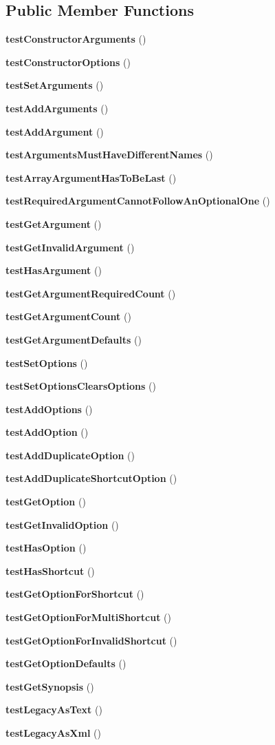 \subsection*{Public Member Functions}
\begin{DoxyCompactItemize}
\item 
{\bf test\+Constructor\+Arguments} ()
\item 
{\bf test\+Constructor\+Options} ()
\item 
{\bf test\+Set\+Arguments} ()
\item 
{\bf test\+Add\+Arguments} ()
\item 
{\bf test\+Add\+Argument} ()
\item 
{\bf test\+Arguments\+Must\+Have\+Different\+Names} ()
\item 
{\bf test\+Array\+Argument\+Has\+To\+Be\+Last} ()
\item 
{\bf test\+Required\+Argument\+Cannot\+Follow\+An\+Optional\+One} ()
\item 
{\bf test\+Get\+Argument} ()
\item 
{\bf test\+Get\+Invalid\+Argument} ()
\item 
{\bf test\+Has\+Argument} ()
\item 
{\bf test\+Get\+Argument\+Required\+Count} ()
\item 
{\bf test\+Get\+Argument\+Count} ()
\item 
{\bf test\+Get\+Argument\+Defaults} ()
\item 
{\bf test\+Set\+Options} ()
\item 
{\bf test\+Set\+Options\+Clears\+Options} ()
\item 
{\bf test\+Add\+Options} ()
\item 
{\bf test\+Add\+Option} ()
\item 
{\bf test\+Add\+Duplicate\+Option} ()
\item 
{\bf test\+Add\+Duplicate\+Shortcut\+Option} ()
\item 
{\bf test\+Get\+Option} ()
\item 
{\bf test\+Get\+Invalid\+Option} ()
\item 
{\bf test\+Has\+Option} ()
\item 
{\bf test\+Has\+Shortcut} ()
\item 
{\bf test\+Get\+Option\+For\+Shortcut} ()
\item 
{\bf test\+Get\+Option\+For\+Multi\+Shortcut} ()
\item 
{\bf test\+Get\+Option\+For\+Invalid\+Shortcut} ()
\item 
{\bf test\+Get\+Option\+Defaults} ()
\item 
{\bf test\+Get\+Synopsis} ()
\item 
{\bf test\+Legacy\+As\+Text} ()
\item 
{\bf test\+Legacy\+As\+Xml} ()
\end{DoxyCompactItemize}
